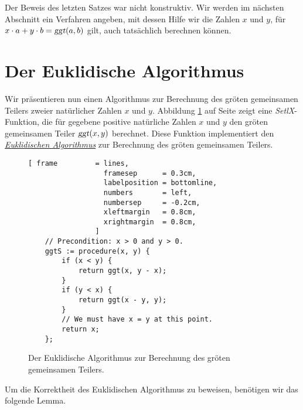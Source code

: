 \remark
Der Beweis des letzten Satzes war nicht konstruktiv.  Wir werden im n\"{a}chsten Abschnitt ein
Verfahren angeben, mit dessen Hilfe wir die Zahlen $x$ und $y$, f\"{u}r 
$x \cdot a + y \cdot b = \textsl{ggt}(a, b)$ gilt, auch tats\"{a}chlich berechnen k\"{o}nnen.


\section{Der Euklidische Algorithmus}
Wir pr\"{a}sentieren nun einen Algorithmus zur Berechnung des gr\"{o}\3ten gemeinsamen 
Teilers zweier nat\"{u}rlicher Zahlen $x$ und $y$.
 Abbildung \ref{fig:ggt.stlx} auf Seite \pageref{fig:ggt.stlx} zeigt eine
\textsl{SetlX}-Funktion, die f\"{u}r gegebene positive nat\"{u}rliche Zahlen $x$ und $y$ den gr\"{o}\3ten gemeinsamen  Teiler 
$\textsl{ggt}(x,y)$ berechnet.  Diese Funktion implementiert den 
\href{https://en.wikipedia.org/wiki/Euclidean_algorithm}{\emph{Euklidischen Algorithmus}} zur
Berechnung des gr\"{o}\3ten gemeinsamen Teilers. 


\begin{figure}[!ht]
\centering
\begin{Verbatim}[ frame         = lines, 
                  framesep      = 0.3cm, 
                  labelposition = bottomline,
                  numbers       = left,
                  numbersep     = -0.2cm,
                  xleftmargin   = 0.8cm,
                  xrightmargin  = 0.8cm,
                ]
    // Precondition: x > 0 and y > 0.
    ggtS := procedure(x, y) {
        if (x < y) {
            return ggt(x, y - x);
        }
        if (y < x) {
            return ggt(x - y, y); 
        }
        // We must have x = y at this point.
        return x;
    };
\end{Verbatim}  
\vspace*{-0.3cm}
\caption{Der Euklidische Algorithmus zur Berechnung des gr\"{o}\3ten gemeinsamen Teilers.}
\label{fig:ggt.stlx}
\end{figure} %

Um die Korrektheit des Euklidischen Algorithmus zu beweisen, ben\"{o}tigen wir das folgende Lemma.

